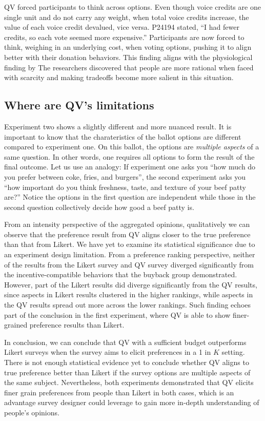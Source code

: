 QV forced participants to think across options. 
Even though voice credits are one single unit 
and do not carry any weight, 
when total voice credits increase, 
the value of each voice credit devalued, 
vice versa. 
P24194 stated, 
``I had fewer credits, so each vote seemed more expensive.''
Participants are now forced to think, weighing in an underlying cost, when voting options, pushing it to align better with their donation behaviors.
This finding aligns with the physiological finding by \textcite{Shah2015a}
The researchers discovered that people are more rational when faced with scarcity and making tradeoffs become more salient in this situation.


\subsection{Where are QV's limitations}
Experiment two shows a slightly different and more nuanced result.
It is important to know that
the charateristics of the ballot options 
are different compared to experiment one.
On this ballot, the options are \textit{multiple aspects}
of a same question.
In other words, 
one requires all options 
to form the result of the final outcome.
Let us use an analogy:
If experiment one asks you
``how much do you prefer between
coke, fries, and burgers'',
the second experiment asks you
``how important do you think
freshness, taste, and texture 
of your beef patty are?''
Notice the options in the first question 
are independent while 
those in the second question 
collectively decide how good a beef patty is.

From an intensity perspective 
of the aggregated opinions, 
qualitatively we can observe that 
the preference result from QV aligns closer 
to the true preference than that from Likert. 
We have yet to examine its statistical significance 
due to an experiment design limitation. 
From a preference ranking perspective, 
neither of the results from the Likert survey 
and QV survey 
diverged significantly 
from the incentive-compatible behaviors 
that the buyback group demonstrated. 
However, part of the Likert results 
did diverge significantly from the QV results, 
since aspects in Likert results clustered 
in the higher rankings, 
while aspects in the QV results 
spread out more across the lower rankings. 
Such finding echoes part of the conclusion 
in the first experiment, 
where QV is able to show finer-grained preference results 
than Likert.

In conclusion,
we can conclude that QV with a sufficient budget outperforms Likert surveys when the survey aims to elicit preferences in a 1 in $K$ setting.
There is not enough statistical evidence yet to conclude whether QV aligns to true preference better than Likert if the survey options are multiple aspects of the same subject. Nevertheless, both experiments demonstrated that QV elicits finer grain preferences from people than Likert in both cases, which is an advantage survey designer could leverage to gain more in-depth understanding of people's opinions.


